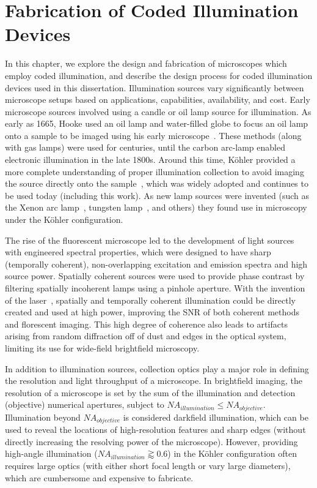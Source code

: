 \chapter{Fabrication of Coded Illumination Devices}\label{ch:fabrication}

In this chapter, we explore the design and fabrication of microscopes which employ coded illumination, and describe the design process for coded illumination devices used in this dissertation. Illumination sources vary significantly between microscope setups based on applications, capabilities, availability, and cost. Early microscope sources involved using a candle or oil lamp source for illumination. As early as 1665, Hooke used an oil lamp and water-filled globe to focus an oil lamp onto a sample to be imaged using his early microscope~\cite{hookeMicrographica}. These methods (along with gas lamps) were used for centuries, until the carbon arc-lamp enabled electronic illumination in the late 1800s. Around this time, K\"ohler provided a more complete understanding of proper illumination collection to avoid imaging the source directly onto the sample~\cite{kohler1893neues}, which was widely adopted and continues to be used today (including this work). As new lamp sources were invented (such as the Xenon arc lamp~\cite{anderson1951xenon}, tungsten lamp~\cite{edison1880electric}, and others) they found use in microscopy under the K\"ohler configuration.

The rise of the fluorescent microscope led to the development of light sources with engineered spectral properties, which were designed to have sharp (temporally coherent), non-overlapping excitation and emission spectra and high source power. Spatially coherent sources were used to provide phase contrast \cite{smithDIC, zernike1942phase} by filtering spatially incoherent lamps using a pinhole aperture. With the invention of the laser~\cite{schawlow1958infrared}, spatially and temporally coherent illumination could be directly created and used at high power, improving the SNR of both coherent methods and florescent imaging. This high degree of coherence also leads to artifacts arising from random diffraction off of dust and edges in the optical system, limiting its use for wide-field brightfield microscopy.

In addition to illumination sources, collection optics play a major role in defining the resolution and light throughput of a microscope. In brightfield imaging, the resolution of a microscope is set by the sum of the illumination and detection (objective) numerical apertures, subject to $NA_{illumination} \leq NA_{objective}$. Illumination beyond $NA_{objective}$ is considered darkfield illumination, which can be used to reveal the locations of high-resolution features and sharp edges (without directly increasing the resolving power of the microscope). However, providing high-angle illumination ($NA_{illumination} \gtrapprox 0.6$) in the K\"ohler configuration often requires large optics (with either short focal length or vary large diameters), which are cumbersome and expensive to fabricate.

